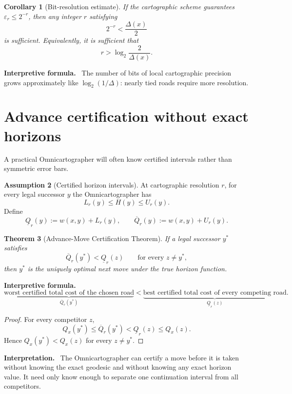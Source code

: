 \documentclass[11pt]{article}
\newtheorem{theorem}{Theorem}[section]
\newtheorem{corollary}[theorem]{Corollary}
\theoremstyle{definition}
\newtheorem{assumption}[theorem]{Assumption}
\theoremstyle{remark}
\newcommand{\Qval}{Q}
\newcommand{\Gap}{\Delta}
\newcommand{\eps}{\varepsilon}
\newenvironment{interpretiveformula}{%
  \begin{center}\begin{minipage}{0.92\textwidth}\small
  \textbf{Interpretive formula.}\ }{\end{minipage}\end{center}}
\newenvironment{interpretation}{%
  \begin{center}\begin{minipage}{0.92\textwidth}\small
  \textbf{Interpretation.}\ }{\end{minipage}\end{center}}
\begin{document}
\begin{corollary}[Bit-resolution estimate]
If the cartographic scheme guarantees $\eps_r\le 2^{-r}$, then any integer $r$ satisfying
\[
2^{-r}<\frac{\Gap(x)}{2}
\]
is sufficient. Equivalently, it is sufficient that
\[
r>\log_2\frac{2}{\Gap(x)}.
\]
\end{corollary}

\begin{interpretiveformula}
The number of bits of local cartographic precision grows approximately like $\log_2(1/\Gap)$: nearly tied roads require more resolution.
\end{interpretiveformula}

\section{Advance certification without exact horizons}
A practical Omnicartographer will often know certified intervals rather than symmetric error bars.

\begin{assumption}[Certified horizon intervals]
At cartographic resolution $r$, for every legal successor $y$ the Omnicartographer has
\[
L_r(y)\le H(y)\le U_r(y).
\]
Define
\[
\underline{\Qval}_r(y):=w(x,y)+L_r(y),\qquad
\overline{\Qval}_r(y):=w(x,y)+U_r(y).
\]
\end{assumption}

\begin{theorem}[Advance-Move Certification Theorem]\label{thm:advance}
If a legal successor $y^*$ satisfies
\[
\boxed{
\overline{\Qval}_r(y^*)<\underline{\Qval}_r(z)
\qquad\text{for every }z\neq y^*,
}
\]
then $y^*$ is the uniquely optimal next move under the true horizon function.
\end{theorem}

\begin{interpretiveformula}
\[
\underbrace{\text{worst certified total cost of the chosen road}}_{\overline{\Qval}_r(y^*)}
<
\underbrace{\text{best certified total cost of every competing road}}_{\underline{\Qval}_r(z)}.
\]
\end{interpretiveformula}

\begin{proof}
For every competitor $z$,
\[
\Qval_x(y^*)\le\overline{\Qval}_r(y^*)<\underline{\Qval}_r(z)\le\Qval_x(z).
\]
Hence $\Qval_x(y^*)<\Qval_x(z)$ for every $z\neq y^*$.
\end{proof}

\begin{interpretation}
The Omnicartographer can certify a move before it is taken without knowing the exact geodesic and without knowing any exact horizon value. It need only know enough to separate one continuation interval from all competitors.
\end{interpretation}
\end{document}
